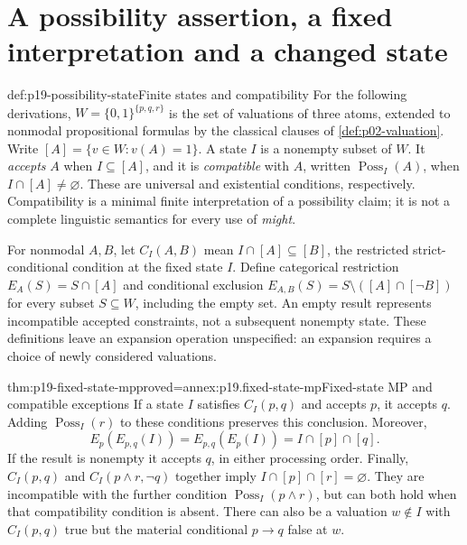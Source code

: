 \section{A possibility assertion, a fixed interpretation and a changed state}
\label{sec:p19-might-and-fixed-context}

\begin{hbdefinition}{def:p19-possibility-state}{Finite states and compatibility}
For the following derivations, \(W=\{0,1\}^{\{p,q,r\}}\) is the set of
valuations of three atoms, extended to nonmodal propositional formulas by
the classical clauses of \cref{def:p02-valuation}. Write
\([A]=\{v\in W:v(A)=1\}\). A state \(I\) is a nonempty subset of \(W\).
It \emph{accepts} \(A\) when \(I\subseteq[A]\), and it is
\emph{compatible} with \(A\), written \(\operatorname{Poss}_I(A)\), when
\(I\cap[A]\ne\varnothing\). These are universal and existential conditions,
respectively. Compatibility is a minimal finite interpretation of a
possibility claim; it is not a complete linguistic semantics for every use
of \emph{might}.

For nonmodal \(A,B\), let \(C_I(A,B)\) mean
\(I\cap[A]\subseteq[B]\), the restricted strict-conditional condition at
the fixed state \(I\). Define categorical restriction
\(E_A(S)=S\cap[A]\) and conditional exclusion
\(E_{A,B}(S)=S\setminus([A]\cap[\neg B])\) for every subset
\(S\subseteq W\), including the empty set.
An empty result represents incompatible accepted constraints, not a
subsequent nonempty state. These definitions leave an expansion operation
unspecified: an expansion requires a choice of newly considered valuations.
\end{hbdefinition}

\begin{hblemma}{thm:p19-fixed-state-mp}{proved=annex:p19.fixed-state-mp}{Fixed-state MP and compatible exceptions}
If a state \(I\) satisfies \(C_I(p,q)\) and accepts \(p\), it accepts \(q\).
Adding \(\operatorname{Poss}_I(r)\) to these conditions preserves this
conclusion. Moreover,
\[
 E_p(E_{p,q}(I))=E_{p,q}(E_p(I))=I\cap[p]\cap[q].
\]
If the result is nonempty it accepts \(q\), in either processing order.
Finally, \(C_I(p,q)\) and \(C_I(p\land r,\neg q)\) together imply
\(I\cap[p]\cap[r]=\varnothing\). They are incompatible with the further
condition \(\operatorname{Poss}_I(p\land r)\), but can both hold when that
compatibility condition is absent.
There can also be a valuation \(w\notin I\) with \(C_I(p,q)\) true
but the material conditional \(p\to q\) false at \(w\).
\end{hblemma}

